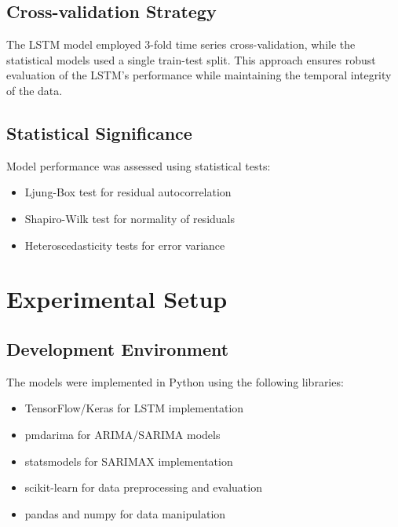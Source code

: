 \documentclass[12pt,a4paper]{report}
\begin{document}
\subsection{Cross-validation Strategy}
The LSTM model employed 3-fold time series cross-validation, while the statistical models used a single train-test split. This approach ensures robust evaluation of the LSTM's performance while maintaining the temporal integrity of the data.

\subsection{Statistical Significance}
Model performance was assessed using statistical tests:
\begin{itemize}
    \item Ljung-Box test for residual autocorrelation
    \item Shapiro-Wilk test for normality of residuals
    \item Heteroscedasticity tests for error variance
\end{itemize}

\section{Experimental Setup}
\subsection{Development Environment}
The models were implemented in Python using the following libraries:
\begin{itemize}
    \item TensorFlow/Keras for LSTM implementation
    \item pmdarima for ARIMA/SARIMA models
    \item statsmodels for SARIMAX implementation
    \item scikit-learn for data preprocessing and evaluation
    \item pandas and numpy for data manipulation
\end{itemize}
\end{document}
